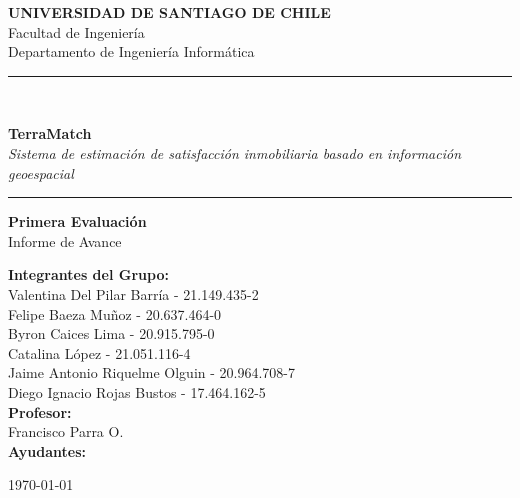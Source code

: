 \documentclass[11pt,letterpaper]{article}
\begin{document}
\begin{titlepage}
    \centering
    \vspace*{1cm}

    \Large{\textbf{UNIVERSIDAD DE SANTIAGO DE CHILE}}\\
    \large{Facultad de Ingeniería}\\
    \large{Departamento de Ingeniería Informática}\\

    \vspace{3cm}

    \rule{\textwidth}{0.5mm}\\
    \vspace{0.5cm}

    {\LARGE\textbf{TerraMatch}}\\
    \vspace{0.3cm}
    {\Large\textit{Sistema de estimación de satisfacción inmobiliaria basado en información geoespacial}}\\

    \vspace{0.5cm}
    \rule{\textwidth}{0.5mm}

    \vspace{2cm}

    {\Large\textbf{Primera Evaluación}}\\
    \vspace{0.5cm}
    {\large Informe de Avance}

    \vspace{3cm}

\begin{minipage}{0.8\textwidth}
    \begin{flushleft}
        \large
        \textbf{Integrantes del Grupo:}\\
        Valentina Del Pilar Barr\'ia - 21.149.435-2\\
        Felipe Baeza Mu\~noz - 20.637.464-0\\
        Byron Caices Lima - 20.915.795-0\\
        Catalina L\'opez - 21.051.116-4\\
        Jaime Antonio Riquelme Olguin - 20.964.708-7\\
        Diego Ignacio Rojas Bustos - 17.464.162-5\\
        \vspace{0.5cm}
        \textbf{Profesor:}\\
        Francisco Parra O.\\
        \vspace{0.5cm}
        \textbf{Ayudantes:}\\
    \end{flushleft}
\end{minipage}


    \vfill

    {\large \today}
\end{titlepage}
\end{document}
